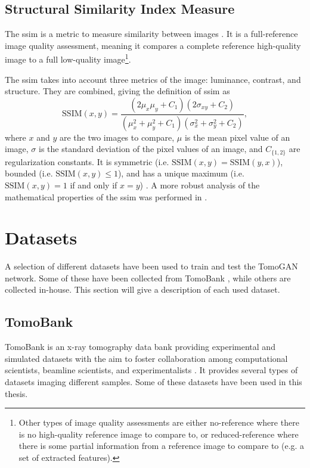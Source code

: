 \subsection{Structural Similarity Index Measure}
The \acrfull{ssim} is a metric to measure similarity between images \cite{ssim}. It is a full-reference image quality assessment, meaning it compares a complete reference high-quality image to a full low-quality image\footnote{Other types of image quality assessments are either no-reference where there is no high-quality reference image to compare to, or reduced-reference where there is some partial information from a reference image to compare to (e.g. a set of extracted features)\cite{ssim}. }. 


The \acrshort{ssim} takes into account three metrics of the image: luminance, contrast, and structure. They are combined, giving the definition of \acrshort{ssim} as \cite{ssim}
\begin{equation}
    \label{eq:ssim}
    \text{SSIM}\left(x,y\right) = \frac{\left( 2\mu_x \mu_y + C_1 \right) \left( 2\sigma_{xy} + C_2 \right)}{\left( \mu_x^2 + \mu_y^2 + C_1 \right) \left( \sigma_x^2 + \sigma_y^2 + C_2 \right)},
\end{equation}
where $x$ and $y$ are the two images to compare, $\mu$ is the mean pixel value of an image, $\sigma$ is the standard deviation of the pixel values of an image, and $C_{\{1,2\}}$ are regularization constants. It is symmetric (i.e. $\text{SSIM}\left(x,y\right) = \text{SSIM}\left(y,x\right)$), bounded (i.e. $\text{SSIM}\left(x,y\right) \leq 1$), and has a unique maximum (i.e. $\text{SSIM}\left(x,y\right) = 1$ if and only if $x = y$) \cite{ssim}. A more robust analysis of the mathematical properties of the \acrshort{ssim} was performed in \cite{6059504}.


\section{Datasets}
\label{sec:method:datasets}
A selection of different datasets have been used to train and test the TomoGAN network. Some of these have been collected from TomoBank \cite{TomoBank}, while others are collected in-house. This section will give a description of each used dataset. 

\subsection{TomoBank}
TomoBank is an x-ray tomography data bank providing experimental and simulated datasets with the aim to foster collaboration among computational scientists, beamline scientists, and experimentalists \cite{TomoBank}. It provides several types of datasets imaging different samples. Some of these datasets have been used in this thesis.

